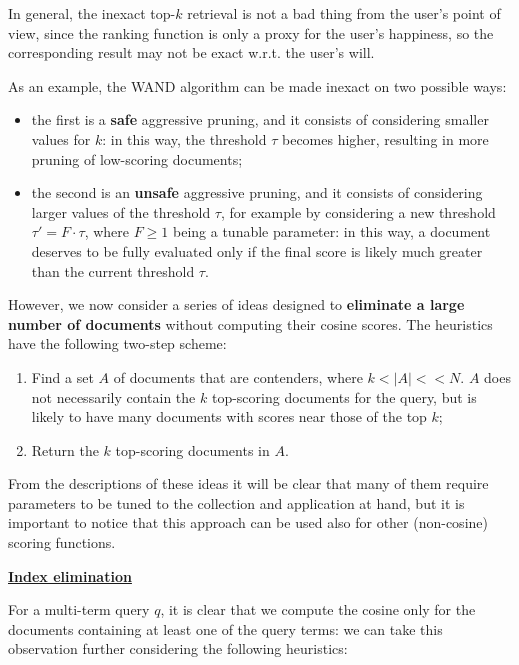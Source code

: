 In general, the inexact top-$k$ retrieval is not a bad thing from the user's point of view, since the ranking function is only a proxy for the user's happiness, so the corresponding result may not be exact w.r.t. the user's will.

As an example, the WAND algorithm can be made inexact on two possible ways:

\begin{itemize}
    \item the first is a \textbf{safe} aggressive pruning, and it consists of considering smaller values for $k$: in this way, the threshold $\tau$ becomes higher, resulting in more pruning of low-scoring documents;
    \item the second is an \textbf{unsafe} aggressive pruning, and it consists of considering larger values of the threshold $\tau$, for example by considering a new threshold $\tau' = F \cdot \tau$, where $F \geq 1$ being a tunable parameter: in this way, a document deserves to be fully evaluated only if the final score is likely much greater than the current threshold $\tau$.
\end{itemize}

However, we now consider a series of ideas designed to \textbf{eliminate a large number of documents} without computing their cosine scores. The heuristics have the following two-step scheme:

\begin{enumerate}
    \item Find a set $A$ of documents that are contenders, where $k < |A| << N$. $A$ does not necessarily contain the $k$ top-scoring documents for the query, but is likely to have many documents with scores near those of the top $k$;
    \item Return the $k$ top-scoring documents in $A$. 
\end{enumerate}

From the descriptions of these ideas it will be clear that many of them require parameters to be tuned to the collection and application at hand, but it is important to notice that this approach can be used also for other (non-cosine) scoring functions.

\underline{\textbf{\textbf{Index elimination}}}

For a multi-term query $q$, it is clear that we compute the cosine only for the documents containing at least one of the query terms: we can take this observation further considering the following heuristics:

